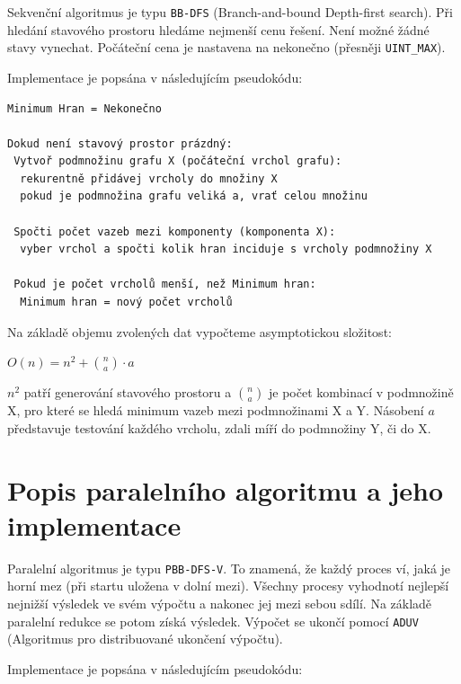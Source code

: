 \documentclass[a4paper,10pt]{report}
\begin{document}
Sekvenční algoritmus je typu \texttt{BB-DFS} (Branch-and-bound Depth-first search). Při hledání stavového prostoru hledáme nejmenší cenu řešení. Není možné žádné stavy vynechat. Počáteční cena je nastavena na nekonečno (přesněji \texttt{UINT\_MAX}).

Implementace je popsána v následujícím pseudokódu:

\begin{verbatim}
Minimum Hran = Nekonečno

Dokud není stavový prostor prázdný:
 Vytvoř podmnožinu grafu X (počáteční vrchol grafu):
  rekurentně přidávej vrcholy do množiny X
  pokud je podmnožina grafu veliká a, vrať celou množinu

 Spočti počet vazeb mezi komponenty (komponenta X):
  vyber vrchol a spočti kolik hran inciduje s vrcholy podmnožiny X
 
 Pokud je počet vrcholů menší, než Minimum hran:
  Minimum hran = nový počet vrcholů

\end{verbatim}

Na základě objemu zvolených dat vypočteme asymptotickou složitost: 

\hspace{1cm}

$O(n)=n^{2} + {n\choose a} \cdot a$

\hspace{1cm}

$n^2$ patří generování stavového prostoru a ${n\choose a}$ je počet kombinací v podmnožině X, pro které se hledá minimum vazeb mezi podmnožinami X a Y. Násobení $a$ představuje testování každého vrcholu, zdali míří do podmnožiny Y, či do X. 

\section{Popis paralelního algoritmu a jeho implementace}

Paralelní algoritmus je typu \texttt{PBB-DFS-V}. To znamená, že každý proces ví, jaká je horní mez (při startu uložena v dolní mezi). Všechny procesy vyhodnotí nejlepší nejnižší výsledek ve svém výpočtu a nakonec jej mezi sebou sdílí. Na základě paralelní redukce se potom získá výsledek. Výpočet se ukončí pomocí \texttt{ADUV} (Algoritmus pro distribuované ukončení výpočtu).

Implementace je popsána v následujícím pseudokódu:
\end{document}

